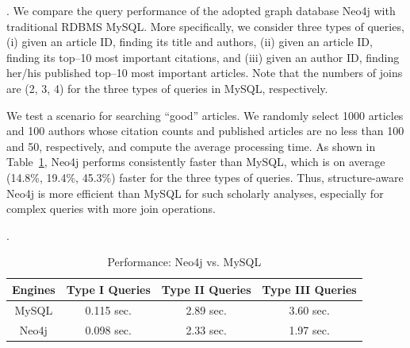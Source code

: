 



.
We compare the query performance of the adopted graph database Neo4j with traditional RDBMS MySQL. More specifically, we consider three types of queries, \ie (i) given an article ID, finding its title and authors, (ii)  given an article ID, finding its top--10 most important citations, and (iii) given an author ID, finding her/his published top--10 most important articles. Note that the numbers of joins are (2, 3, 4) for the three types of queries in MySQL, respectively.

We test a scenario for searching ``good'' articles. We randomly select 1000 articles and 100 authors whose citation counts and published articles are no less than 100 and 50, respectively, and compute the average processing time. As shown in Table~\ref{tab-compare}, Neo4j performs consistently faster than MySQL, which is on average (14.8\%, 19.4\%, 45.3\%) faster for the three types of queries.
Thus, structure-aware Neo4j is more efficient than MySQL for such scholarly analyses, especially for complex queries with more join operations.


.




\begin{table}[t!]
\begin{center}
\caption{Performance: Neo4j vs. MySQL}
\label{tab-compare}
\begin{scriptsize}
\begin{tabular}{|c|c|c|c|} %
\hline
{Engines} & {Type I Queries} & {Type II Queries} & {Type III  Queries}\\
\hline %
MySQL & 0.115 sec.  & 2.89 sec. & 3.60 sec. \\
\hline
Neo4j & 0.098 sec.  & 2.33 sec. & 1.97 sec. \\
\hline
\end{tabular}
\end{scriptsize}
\vspace{-4ex}
\end{center}
\end{table}


